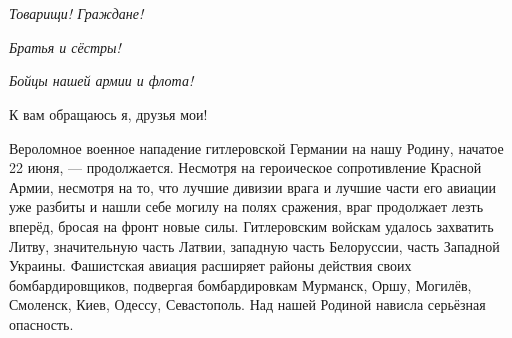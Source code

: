 \documentclass[12pt, a4paper, openany]{book}
\begin{document}
\begin{titlepage}
	
\fontsize{18pt}{18pt}\selectfont\centering{\textbf{\textcolor{red}{}}}

\fontsize{80pt}{80pt}\selectfont{}

\vspace{2cm}

\fontsize{60pt}{40pt}\selectfont{}
\vspace{3cm}


\fontsize{14pt}{16pt}\selectfont{} 


\vspace{\fill}


	\fontsize{12pt}{14pt}



\end{titlepage}





\newpage
\tableofcontents

\thispagestyle{empty} %

\newpage

\setcounter{secnumdepth}{0} 




\section[ВЫСТУПЛЕНИЕ ПО РАДИО 3 июля 1941 года]{}

\begin{center}
\textit{Товарищи! Граждане!}

\textit{Братья и сёстры!}

\textit{Бойцы нашей армии и флота!}
 
\end{center}
К вам обращаюсь я, друзья мои!

Вероломное военное нападение гитлеровской Германии на нашу Родину, начатое 22 июня, — продолжается. Несмотря на героическое сопротивление Красной Армии, несмотря на то, что лучшие дивизии врага и лучшие части его авиации уже разбиты и нашли себе могилу на полях сражения, враг продолжает лезть вперёд, бросая на фронт новые силы. Гитлеровским войскам удалось захватить Литву, значительную часть Латвии, западную часть Белоруссии, часть Западной Украины. Фашистская авиация расширяет районы действия своих бомбардировщиков, подвергая бомбардировкам Мурманск, Оршу, Могилёв, Смоленск, Киев, Одессу, Севастополь. Над нашей Родиной нависла серьёзная опасность.
\end{document}
